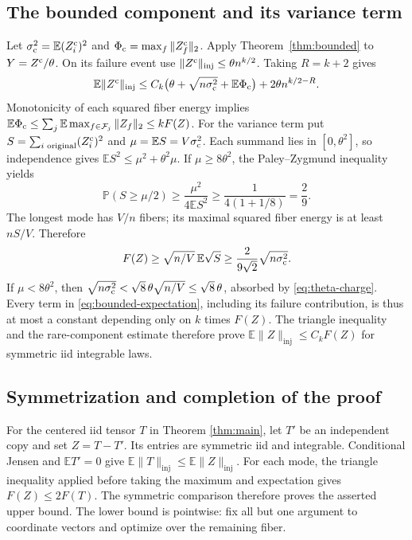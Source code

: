 \documentclass[11pt]{article}
\theoremstyle{spaced}
\theoremstyle{remark}
\numberwithin{equation}{section}
\newcommand{\E}{\mathbb E}
\newcommand{\Pp}{\mathbb P}
\newcommand{\inj}{\mathrm{inj}}
\begin{document}
\subsection{The bounded component and its variance term}

Let $\sigma_{\rm c}^2=\E(Z_i^{\rm c})^2$ and
$\Phi_{\rm c}=\max_f\|Z_f^{\rm c}\|_2$.
Apply Theorem~\ref{thm:bounded} to $Y=Z^{\rm c}/\theta$.
On its failure event use
$\|Z^{\rm c}\|_{\inj}\le\theta n^{k/2}$.
Taking $R=k+2$ gives
\begin{equation}\label{eq:bounded-expectation}
 \E\|Z^{\rm c}\|_{\inj}
 \le C_k\bigl(\theta+\sqrt{n\sigma_{\rm c}^2}+\E\Phi_{\rm c}\bigr)
       +2\theta n^{k/2-R}.
\end{equation}
Monotonicity of each squared fiber energy implies
$\E\Phi_{\rm c}\le\sum_j\E\max_{f\in\mathcal F_j}\|Z_f\|_2
\le kF(Z)$.
For the variance term put
$S=\sum_{i\text{ original}}(Z_i^{\rm c})^2$ and
$\mu=\E S=V\sigma_{\rm c}^2$.
Each summand lies in $[0,\theta^2]$, so independence gives
$\E S^2\le\mu^2+\theta^2\mu$.
If $\mu\ge8\theta^2$, the Paley--Zygmund inequality yields
\[
 \Pp(S\ge\mu/2)\ge\frac{\mu^2}{4\E S^2}
 \ge\frac1{4(1+1/8)}=\frac29.
\]
The longest mode has $V/n$ fibers; its maximal squared fiber energy
is at least $nS/V$. Therefore
\[
 F(Z)\ge\sqrt{n/V}\,\E\sqrt S
 \ge\frac{2}{9\sqrt2}\sqrt{n\sigma_{\rm c}^2}.
\]
If $\mu<8\theta^2$, then
$\sqrt{n\sigma_{\rm c}^2}<\sqrt8\,\theta\sqrt{n/V}
\le\sqrt8\,\theta$, absorbed by \eqref{eq:theta-charge}.
Every term in \eqref{eq:bounded-expectation}, including its failure contribution,
is thus at most a constant depending only on $k$ times $F(Z)$.
The triangle inequality and the rare-component estimate therefore
prove $\E\|Z\|_{\inj}\le C_kF(Z)$ for symmetric iid integrable laws.

\subsection{Symmetrization and completion of the proof}

For the centered iid tensor $T$ in Theorem \ref{thm:main}, let $T'$
be an independent copy and set $Z=T-T'$. Its entries are symmetric iid
and integrable. Conditional Jensen and $\E T'=0$ give
$\E\|T\|_{\inj}\le\E\|Z\|_{\inj}$.
For each mode, the triangle inequality applied before taking the
maximum and expectation gives $F(Z)\le2F(T)$.
The symmetric comparison therefore proves the asserted upper bound.
The lower bound is pointwise: fix all but one argument to coordinate
vectors and optimize over the remaining fiber.
\end{document}
